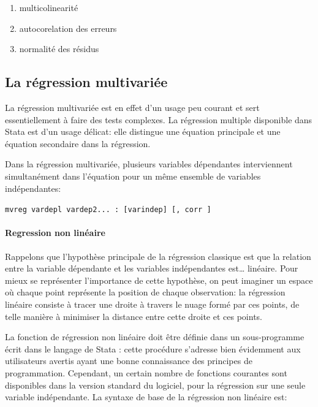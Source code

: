 \documentclass[
]{book}
\providecommand{\tightlist}{%
  \setlength{\itemsep}{0pt}\setlength{\parskip}{0pt}}
\begin{document}
\begin{enumerate}
\def\labelenumi{(\arabic{enumi})}
\tightlist
\item
  multicolinearité
\item
  autocorelation des erreurs
\item
  normalité des résidus
\end{enumerate}

\hypertarget{la-ruxe9gression-multivariuxe9e}{%
\subsection{La régression multivariée}\label{la-ruxe9gression-multivariuxe9e}}

La régression multivariée est en effet d'un
usage peu courant et sert essentiellement à faire des tests
complexes. La régression multiple disponible dans Stata est d'un
usage délicat: elle distingue une équation principale et une
équation secondaire dans la régression.

Dans la régression multivariée, plusieurs variables dépendantes
interviennent simultanément dans l'équation pour un même
ensemble de variables indépendantes:

\texttt{mvreg\ vardepl\ vardep2...\ :\ {[}varindep{]}\ {[},\ corr\ {]}}

\hypertarget{regression-non-linuxe9aire}{%
\paragraph{Regression non linéaire}\label{regression-non-linuxe9aire}}

Rappelons que l'hypothèse principale de la régression classique
est que la relation entre la variable dépendante et les variables
indépendantes est\ldots{} linéaire. Pour mieux se représenter
l'importance de cette hypothèse, on peut imaginer un espace où
chaque point représente la position de chaque observation: la
régression linéaire consiste à tracer une droite à travers le nuage
formé par ces points, de telle manière à minimiser la distance
entre cette droite et ces points.

La fonction de régression non linéaire doit être définie dans un
sous-programme écrit dans le langage de Stata : cette procédure
s'adresse bien évidemment aux utilisateurs avertis ayant une
bonne connaissance des principes de programmation.
Cependant, un certain nombre de fonctions courantes sont
disponibles dans la version standard du logiciel, pour la
régression sur une seule variable indépendante. La syntaxe de
base de la régression non linéaire est:
\end{document}
